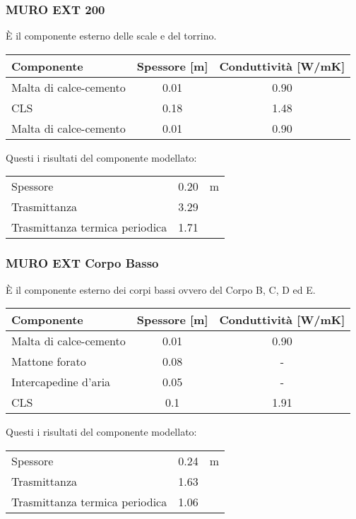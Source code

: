 \subsubsection{MURO EXT 200}
È il componente esterno delle scale e del torrino.
\begin{center}
	\begin{tabular}{lcc}
		\toprule
		Componente & Spessore [m] & Conduttività [\si{W/mK}] \\
		\midrule
		Malta di calce-cemento & \num{0.01} & \num{0.90} \\
		CLS & \num{0.18} & \num{1.48}\\
		Malta di calce-cemento & \num{0.01} & \num{0.90} \\
		\bottomrule
	\end{tabular}
\end{center}
Questi i risultati del componente modellato:
\begin{center}
	\begin{tabular}{lcc}
		\toprule
		Spessore & \num{0.20} & \si{m}\\
		Trasmittanza & \num{3.29} & \trasm\\
		Trasmittanza termica periodica & \num{1.71} & \trasm\\
		\bottomrule
	\end{tabular}
\end{center}

\subsubsection{MURO EXT Corpo Basso}
È il componente esterno dei corpi bassi ovvero del Corpo B, C, D ed E.
\begin{center}
	\begin{tabular}{lcc}
		\toprule
		Componente & Spessore [m] & Conduttività [\si{W/mK}] \\
		\midrule
		Malta di calce-cemento & \num{0.01} & \num{0.90} \\
		Mattone forato & \num{0.08} & -\\
		Intercapedine d'aria & \num{0.05} & - \\
		CLS & \num{0.1} & \num{1.91}\\
		\bottomrule
	\end{tabular}
\end{center}
Questi i risultati del componente modellato:
\begin{center}
	\begin{tabular}{lcc}
		\toprule
		Spessore & \num{0.24} & \si{m}\\
		Trasmittanza & \num{1.63} & \trasm\\
		Trasmittanza termica periodica & \num{1.06} & \trasm\\
		\bottomrule
	\end{tabular}
\end{center}
